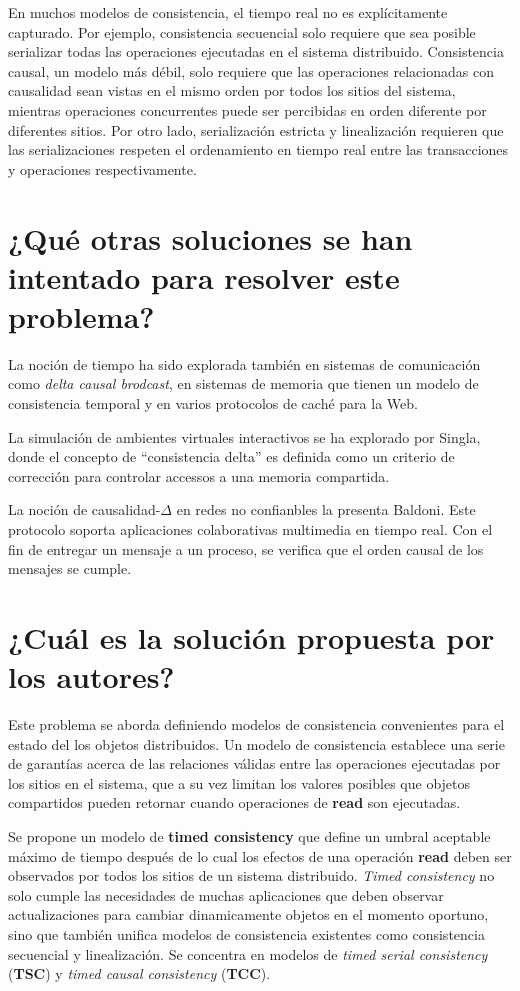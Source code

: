 En muchos modelos de consistencia, el tiempo real no es explícitamente capturado. Por ejemplo, consistencia secuencial solo requiere que sea posible serializar todas las operaciones ejecutadas en el sistema distribuido. Consistencia causal, un modelo más débil, solo requiere que las operaciones relacionadas con causalidad sean vistas en el mismo orden por todos los sitios del sistema, mientras operaciones concurrentes puede ser percibidas en orden diferente por diferentes sitios. Por otro lado, serialización estricta y linealización requieren que las serializaciones respeten el ordenamiento en tiempo real entre las transacciones y operaciones respectivamente. 

\section{¿Qué otras soluciones se han intentado para resolver este problema?}
La noción de tiempo ha sido explorada también en sistemas de comunicación como \emph{delta causal brodcast}, en sistemas de memoria que tienen un modelo de consistencia temporal y en varios protocolos de caché para la Web.

La simulación de ambientes virtuales interactivos se ha explorado por Singla, donde el concepto de ``consistencia delta'' es definida como un criterio de corrección para controlar accessos a una memoria compartida. 

La noción de causalidad-$\Delta$ en redes no confianbles la presenta Baldoni. Este protocolo soporta aplicaciones colaborativas multimedia en tiempo real. Con el fin de entregar un mensaje a un proceso, se verifica que el orden causal de los mensajes se cumple.
     
\section{¿Cuál es la solución propuesta por los autores?}
Este problema se aborda definiendo modelos de consistencia convenientes para el estado del los objetos distribuidos. Un modelo de consistencia establece una serie de garantías acerca de las relaciones válidas entre las operaciones ejecutadas por los sitios en el sistema, que a su vez limitan los valores posibles que objetos compartidos pueden retornar cuando operaciones de \textbf{read} son ejecutadas.

Se propone un modelo de \textbf{timed consistency} que define un umbral aceptable máximo de tiempo después de lo cual los efectos de una operación \textbf{read} deben ser observados por todos los sitios de un sistema distribuido. \emph{Timed consistency} no solo cumple las necesidades de muchas aplicaciones que deben observar actualizaciones para cambiar dinamicamente objetos en el momento oportuno, sino que también unifica modelos de consistencia existentes como consistencia secuencial y linealización. Se concentra en modelos de \emph{timed serial consistency} (\textbf{TSC}) y \emph{timed causal consistency} (\textbf{TCC}).

